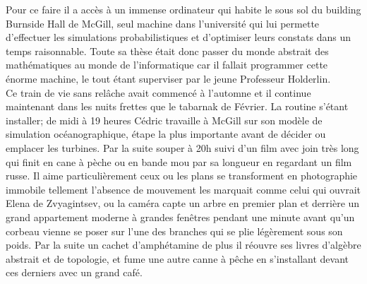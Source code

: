 \documentclass{article}
\begin{document}
Pour ce faire il a accès à un immense ordinateur qui habite le sous sol du
building Burnside Hall de McGill, seul machine dans l'université qui lui
permette d'effectuer les simulations probabilistiques et d'optimiser leurs
constats dans un temps raisonnable. Toute sa thèse était donc passer du monde
abstrait des mathématiques au monde de l'informatique car il fallait programmer
cette énorme machine, le tout étant superviser par le jeune Professeur
Holderlin.\\

Ce train de vie sans relâche avait commencé à l'automne et il continue
maintenant dans les nuits frettes que le tabarnak de Février. La routine s'étant
installer; de midi à 19 heures Cédric travaille à McGill sur son modèle de
simulation océanographique, étape la plus importante avant de décider ou
emplacer les turbines. Par la suite souper à 20h suivi d'un film avec join très
long qui finit en cane à pèche ou en bande mou par sa longueur en regardant
un film russe. Il aime particulièrement ceux ou les plans se transforment en
photographie immobile tellement l'absence de mouvement les marquait comme celui
qui ouvrait Elena de Zvyagintsev, ou la caméra capte un arbre en premier plan et
derrière un grand appartement moderne à grandes fenêtres pendant une minute
avant qu'un corbeau vienne se poser sur l'une des branches qui se plie
légèrement sous son poids. Par la suite un cachet d'amphétamine de plus il
réouvre ses livres d'algèbre abstrait et de topologie, et fume une autre
canne à pêche en s'installant devant ces derniers avec un grand café.\\
\end{document}
